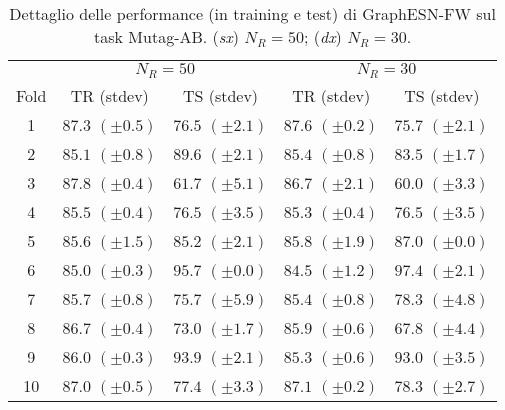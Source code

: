 \begin{table}[tbph]
\footnotesize
\caption[Dettaglio performance: GraphESN-FW su Mutag-AB]{Dettaglio delle performance (in training e test) di GraphESN-FW sul task Mutag-AB. (\emph{sx}) $N_R=50$; (\emph{dx}) $N_R=30$.}
\label{app:esp:Mutag-AB-FW}
\centering
\begin{tabular}{c*{4}{c}}
\toprule
& \multicolumn{2}{c}{$N_R=50$} & \multicolumn{2}{c}{$N_R=30$}\\
Fold & TR (stdev) & TS (stdev) & TR (stdev) & TS (stdev)\\
\midrule
1 & $87.3$ $(\pm 0.5)$ & $76.5$ $(\pm 2.1)$ & $87.6$ $(\pm 0.2)$ & $75.7$ $(\pm 2.1)$\\
2 & $85.1$ $(\pm 0.8)$ & $89.6$ $(\pm 2.1)$ & $85.4$ $(\pm 0.8)$ & $83.5$ $(\pm 1.7)$\\
3 & $87.8$ $(\pm 0.4)$ & $61.7$ $(\pm 5.1)$ & $86.7$ $(\pm 2.1)$ & $60.0$ $(\pm 3.3)$\\
4 & $85.5$ $(\pm 0.4)$ & $76.5$ $(\pm 3.5)$ & $85.3$ $(\pm 0.4)$ & $76.5$ $(\pm 3.5)$\\
5 & $85.6$ $(\pm 1.5)$ & $85.2$ $(\pm 2.1)$ & $85.8$ $(\pm 1.9)$ & $87.0$ $(\pm 0.0)$\\
6 & $85.0$ $(\pm 0.3)$ & $95.7$ $(\pm 0.0)$ & $84.5$ $(\pm 1.2)$ & $97.4$ $(\pm 2.1)$\\
7 & $85.7$ $(\pm 0.8)$ & $75.7$ $(\pm 5.9)$ & $85.4$ $(\pm 0.8)$ & $78.3$ $(\pm 4.8)$\\
8 & $86.7$ $(\pm 0.4)$ & $73.0$ $(\pm 1.7)$ & $85.9$ $(\pm 0.6)$ & $67.8$ $(\pm 4.4)$\\
9 & $86.0$ $(\pm 0.3)$ & $93.9$ $(\pm 2.1)$ & $85.3$ $(\pm 0.6)$ & $93.0$ $(\pm 3.5)$\\
10 & $87.0$ $(\pm 0.5)$ & $77.4$ $(\pm 3.3)$ & $87.1$ $(\pm 0.2)$ & $78.3$ $(\pm 2.7)$\\
\bottomrule
\end{tabular}
\end{table}



